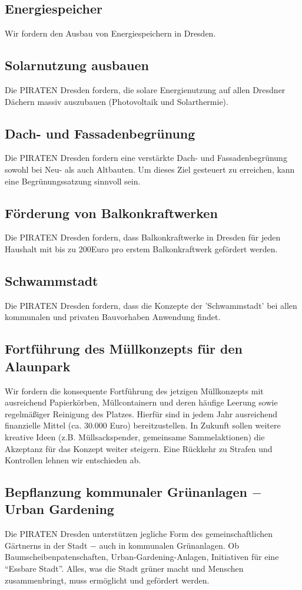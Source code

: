 \documentclass[a4paper, 11pt]{article}
\begin{document}
\subsection{Energiespeicher}
Wir fordern den Ausbau von Energiespeichern in Dresden.


\subsection{Solarnutzung ausbauen}
Die PIRATEN Dresden fordern, die solare Energienutzung auf allen Dresdner Dächern massiv auszubauen (Photovoltaik und Solarthermie).


\subsection{Dach- und Fassadenbegrünung}
Die PIRATEN Dresden fordern eine verstärkte Dach- und Fassadenbegrünung sowohl bei Neu- als auch Altbauten. Um dieses Ziel gesteuert zu erreichen, kann eine Begrünungssatzung sinnvoll sein.


\subsection{Förderung von Balkonkraftwerken}
Die PIRATEN Dresden fordern, dass Balkonkraftwerke in Dresden für jeden Haushalt mit bis zu 200Euro pro erstem Balkonkraftwerk gefördert werden.

\subsection{Schwammstadt}
Die PIRATEN Dresden fordern, dass die Konzepte der 'Schwammstadt' bei allen kommunalen und privaten Bauvorhaben Anwendung findet.

\subsection{Fortführung des Müllkonzepts für den Alaunpark}
Wir fordern die konsequente Fortführung des jetzigen Müllkonzepts mit ausreichend Papierkörben, Müllcontainern und deren häufige Leerung sowie regelmäßiger Reinigung des Platzes. Hierfür sind in jedem Jahr ausreichend finanzielle Mittel (ca. 30.000 Euro) bereitzustellen. In Zukunft sollen weitere kreative Ideen (z.B. Müllsackspender, gemeinsame Sammelaktionen) die Akzeptanz für das Konzept weiter steigern. Eine Rückkehr zu Strafen und Kontrollen lehnen wir entschieden ab.


\subsection{Bepflanzung kommunaler Grünanlagen $-$ Urban Gardening}
Die PIRATEN Dresden unterstützen jegliche Form des gemeinschaftlichen Gärtnerns in der Stadt $-$ auch in kommunalen Grünanlagen. Ob Baumscheibenpatenschaften, Urban-Gardening-Anlagen, Initiativen für eine ``Essbare Stadt''. Alles, was die Stadt grüner macht und Menschen zusammenbringt, muss ermöglicht und gefördert werden.
\end{document}
